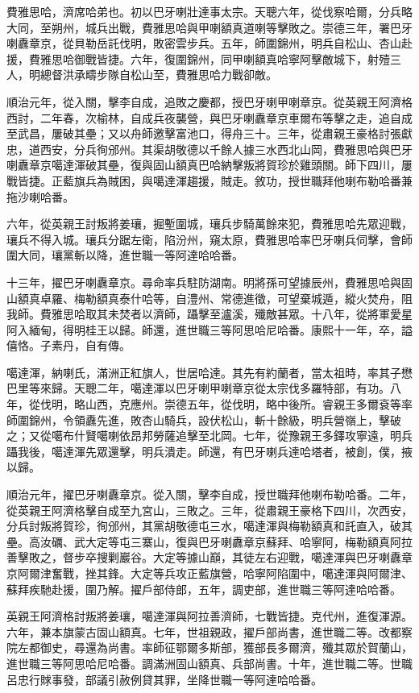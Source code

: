 \begin{pinyinscope}
費雅思哈，濟席哈弟也。初以巴牙喇壯達事太宗。天聰六年，從伐察哈爾，分兵略大同，至朔州，城兵出戰，費雅思哈與甲喇額真道喇等擊敗之。崇德三年，署巴牙喇纛章京，從貝勒岳託伐明，敗密雲步兵。五年，師圍錦州，明兵自松山、杏山赴援，費雅思哈御戰皆捷。六年，復圍錦州，同甲喇額真哈寧阿擊敵城下，射殪三人，明總督洪承疇步隊自松山至，費雅思哈力戰卻敵。

順治元年，從入關，擊李自成，追敗之慶都，授巴牙喇甲喇章京。從英親王阿濟格西討，二年春，次榆林，自成兵夜襲營，與巴牙喇纛章京車爾布等擊之走，追自成至武昌，屢破其壘；又以舟師邀擊富池口，得舟三十。三年，從肅親王豪格討張獻忠，道西安，分兵徇邠州。其渠胡敬德以千餘人據三水西北山岡，費雅思哈與巴牙喇纛章京噶達渾破其壘，復與固山額真巴哈納擊叛將賀珍於雞頭關。師下四川，屢戰皆捷。正藍旗兵為賊困，與噶達渾趨援，賊走。敘功，授世職拜他喇布勒哈番兼拖沙喇哈番。

六年，從英親王討叛將姜瓖，掘塹圍城，瓖兵步騎萬餘來犯，費雅思哈先眾迎戰，瓖兵不得入城。瓖兵分踞左衛，陷汾州，窺太原，費雅思哈率巴牙喇兵伺擊，會師圍大同，瓖黨斬以降，進世職一等阿達哈哈番。

十三年，擢巴牙喇纛章京。尋命率兵駐防湖南。明將孫可望據辰州，費雅思哈與固山額真卓羅、梅勒額真泰什哈等，自澧州、常德進徵，可望棄城遁，縱火焚舟，阻我師。費雅思哈取其未焚者以濟師，躡擊至瀘溪，殲敵甚眾。十八年，從將軍愛星阿入緬甸，得明桂王以歸。師還，進世職三等阿思哈尼哈番。康熙十一年，卒，謚僖恪。子素丹，自有傳。

噶達渾，納喇氏，滿洲正紅旗人，世居哈達。其先有約蘭者，當太祖時，率其子懋巴里等來歸。天聰二年，噶達渾以巴牙喇甲喇章京從太宗伐多羅特部，有功。八年，從伐明，略山西，克應州。崇德五年，從伐明，略中後所。睿親王多爾袞等率師圍錦州，令領纛先進，敗杏山騎兵，設伏松山，斬十餘級，明兵營嶺上，擊破之；又從噶布什賢噶喇依昂邦勞薩追擊至北岡。七年，從豫親王多鐸攻寧遠，明兵躡我後，噶達渾先眾還擊，明兵潰走。師還，有巴牙喇兵達哈塔者，被創，僕，掖以歸。

順治元年，擢巴牙喇纛章京。從入關，擊李自成，授世職拜他喇布勒哈番。二年，從英親王阿濟格擊自成至九宮山，三敗之。三年，從肅親王豪格下四川，次西安，分兵討叛將賀珍，徇邠州，其黨胡敬德屯三水，噶達渾與梅勒額真和託直入，破其壘。高汝礪、武大定等屯三寨山，復與巴牙喇纛章京蘇拜、哈寧阿，梅勒額真阿拉善擊敗之，督步卒搜剿巖谷。大定等據山巔，其徒左右迎戰，噶達渾與巴牙喇纛章京阿爾津奮戰，挫其鋒。大定等兵攻正藍旗營，哈寧阿陷圍中，噶達渾與阿爾津、蘇拜疾馳赴援，圍乃解。擢戶部侍郎，五年，調吏部，進世職三等阿達哈哈番。

英親王阿濟格討叛將姜瓖，噶達渾與阿拉善濟師，七戰皆捷。克代州，進復渾源。六年，兼本旗蒙古固山額真。七年，世祖親政，擢戶部尚書，進世職二等。改都察院左都御史，尋還為尚書。率師征鄂爾多斯部，獲部長多爾濟，殲其眾於賀蘭山，進世職三等阿思哈尼哈番。調滿洲固山額真、兵部尚書。十年，進世職二等。世職呂忠行賕事發，部議引赦例貸其罪，坐降世職一等阿達哈哈番。


\end{pinyinscope}
